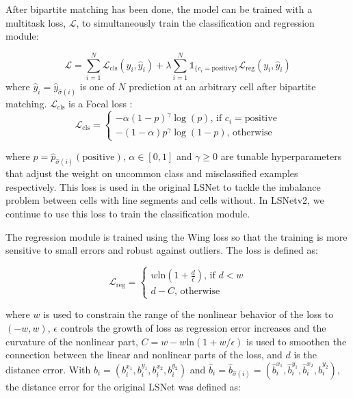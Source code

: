 \documentclass[journal]{IEEEtran}
\begin{document}
After bipartite matching has been done, the model can be trained with a multitask loss, $\mathcal{L}$, to simultaneously train the classification and regression module:

\begin{equation} \label{multitask_training_loss}
\mathcal{L} = \sum_{i=1}^N\mathcal{L}_{\text{cls}}(y_i, \hat{y}_i) + \lambda \sum_{i=1}^N\mathds{1}_{\{c_i=\text{positive}\}}\mathcal{L}_\text{reg}(y_i, \hat{y}_i) 
\end{equation}
\noindent where $\hat{y}_i = \hat{y}_{\hat{\sigma}(i)}$ is one of $N$ prediction at an arbitrary cell after bipartite matching. $\mathcal{L}_{\text{cls}}$ is a Focal loss \cite{focal_loss}:
\begin{equation}
  \mathcal{L}_{\text{cls}} =
    \begin{cases}
      -\alpha (1 - p)^\gamma \log(p) \text{,  if  } c_i=\text{positive} \\
      -(1 - \alpha)p^\gamma \log(1-p) \text{,  otherwise} 
    \end{cases}       
\end{equation}

\noindent where $p=\hat{p}_{\hat{\sigma}(i)}(\text{positive})$, $\alpha \in [0, 1]$ and $\gamma \geq 0$ are tunable hyperparameters that adjust the weight on uncommon class and misclassified examples respectively. This loss is used in the original LSNet to tackle the imbalance problem between cells with line segments and cells without. In LSNetv2, we continue to use this loss to train the classification module.

The regression module is trained using the Wing loss \cite{wing_loss} so that the training is more sensitive to small errors and robust against outliers. The loss is defined as:

\begin{equation}
  \mathcal{L}_{\text{reg}} =
    \begin{cases}
      w \text{ln} (1 + \frac{d}{\epsilon}) \text{, if } d < w \\
      d - C \text{,  otherwise}
    \end{cases}       
\end{equation}

\noindent where $w$ is used to constrain the range of the nonlinear behavior of the loss to $(-w, w)$, $\epsilon$ controls the growth of loss as regression error increases and the curvature of the nonlinear part, $C = w - w\text{ln}(1 + w / \epsilon)$ is used to smoothen the connection between the linear and nonlinear parts of the loss, and $d$ is the distance error. 
With $b_i = (b_i^{x_1}, b_i^{y_1}, b_i^{x_2}, b_i^{y_2})$ and $\hat{b}_i = \hat{b}_{\hat{\sigma}(i)} = (\hat{b}_i^{x_1}, \hat{b}_i^{y_1}, \hat{b}_i^{x_2}, \hat{b}_i^{y_2})$, the distance error for the original LSNet was defined as:
\end{document}
